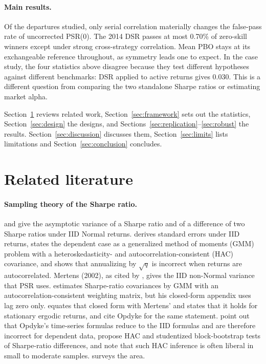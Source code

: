 \documentclass[11pt,a4paper]{article}
\begin{document}
\paragraph{Main results.} Of the departures studied, only serial correlation materially changes the false-pass rate of uncorrected PSR(0). The 2014 DSR passes at most 0.70\% of zero-skill winners except under strong cross-strategy correlation. Mean PBO stays at its exchangeable reference throughout, as symmetry leads one to expect. In the case study, the four statistics above disagree because they test different hypotheses against different benchmarks: DSR applied to active returns gives 0.030. This is a different question from comparing the two standalone Sharpe ratios or estimating market alpha.

Section~\ref{sec:lit} reviews related work, Section~\ref{sec:framework} sets out the statistics, Section~\ref{sec:design} the designs, and Sections~\ref{sec:replication}--\ref{sec:robust} the results. Section~\ref{sec:discussion} discusses them, Section~\ref{sec:limits} lists limitations and Section~\ref{sec:conclusion} concludes.

\section{Related literature}\label{sec:lit}

\paragraph{Sampling theory of the Sharpe ratio.} \citet{jobson1981} and \citet{memmel2003} give the asymptotic variance of a Sharpe ratio and of a difference of two Sharpe ratios under IID Normal returns. \citet{lo2002} derives standard errors under IID returns, states the dependent case as a generalized method of moments (GMM) problem with a heteroskedasticity- and autocorrelation-consistent (HAC) covariance, and shows that annualizing by $\sqrt q$ is incorrect when returns are autocorrelated. Mertens (2002), as cited by \citet{bailey2012frontier}, gives the IID non-Normal variance that PSR uses. \citet{christie2005} estimates Sharpe-ratio covariances by GMM with an autocorrelation-consistent weighting matrix, but his closed-form appendix uses lag zero only. \citet{opdyke2007} equates that closed form with Mertens' and states that it holds for stationary ergodic returns, and \citet[pp.~4, 8]{bailey2012frontier} cite Opdyke for the same statement. \citet[Remark~3.1]{ledoit2008} point out that Opdyke's time-series formulas reduce to the IID formulas and are therefore incorrect for dependent data, propose HAC and studentized block-bootstrap tests of Sharpe-ratio differences, and note that such HAC inference is often liberal in small to moderate samples. \citet{pav2021} surveys the area.
\end{document}
